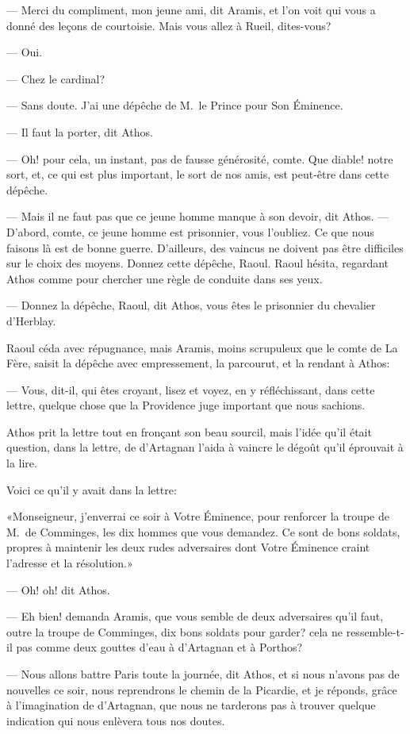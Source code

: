 — Merci du compliment, mon jeune ami, dit Aramis, et l'on voit qui vous a donné des leçons de courtoisie. Mais vous allez à Rueil, dites-vous?

— Oui.

— Chez le cardinal?

— Sans doute. J'ai une dépêche de M.~le Prince pour Son Éminence.

— Il faut la porter, dit Athos.

— Oh! pour cela, un instant, pas de fausse générosité, comte. Que diable! notre sort, et, ce qui est plus important, le sort de nos amis, est peut-être dans cette dépêche.

— Mais il ne faut pas que ce jeune homme manque à son devoir, dit Athos.
— D'abord, comte, ce jeune homme est prisonnier, vous l'oubliez. Ce que nous faisons là est de bonne guerre. D'ailleurs, des
vaincus ne doivent pas être difficiles sur le choix des moyens. Donnez cette dépêche, Raoul.
Raoul hésita, regardant Athos comme pour chercher une règle de conduite dans ses yeux.

— Donnez la dépêche, Raoul, dit Athos, vous êtes le prisonnier du chevalier d'Herblay.

Raoul céda avec répugnance, mais Aramis, moins scrupuleux que le comte de La Fère, saisit la dépêche avec empressement, la parcourut, et la rendant à Athos:

— Vous, dit-il, qui êtes croyant, lisez et voyez, en y réfléchissant, dans cette lettre, quelque chose que la Providence juge important que nous sachions.

Athos prit la lettre tout en fronçant son beau sourcil, mais l'idée qu'il était question, dans la lettre, de d'Artagnan l'aida à vaincre le dégoût qu'il éprouvait à la lire.

Voici ce qu'il y avait dans la lettre:

«Monseigneur, j'enverrai ce soir à Votre Éminence, pour renforcer la troupe de M.~de Comminges, les dix hommes que vous demandez. Ce sont de bons soldats, propres à maintenir les deux rudes adversaires dont Votre Éminence craint l'adresse et la résolution.»

— Oh! oh! dit Athos.

— Eh bien! demanda Aramis, que vous semble de deux adversaires qu'il faut, outre la troupe de Comminges, dix bons soldats pour garder? cela ne ressemble-t-il pas comme deux gouttes d'eau à d'Artagnan et à Porthos?

— Nous allons battre Paris toute la journée, dit Athos, et si nous n'avons pas de nouvelles ce soir, nous reprendrons le chemin de la Picardie, et je réponds, grâce à l'imagination de d'Artagnan, que nous ne tarderons pas à trouver quelque indication qui nous enlèvera tous nos doutes.

